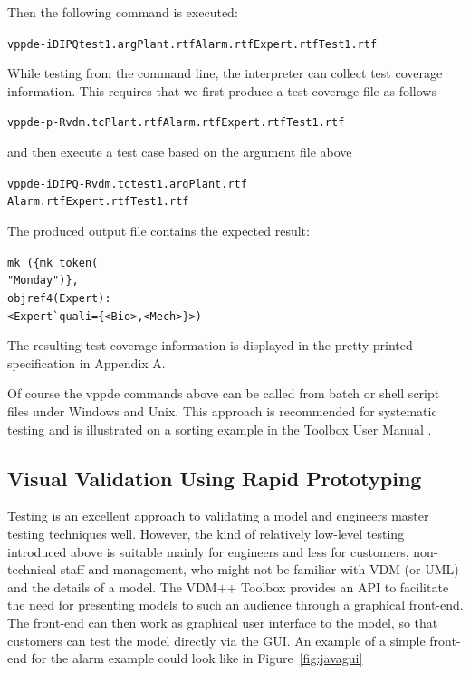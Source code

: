 \documentclass[\pformat,12pt,twoside]{article}
\begin{document}
Then the following command is executed: 

\small
\begin{alltt}
  vppde -iDIPQ test1.arg Plant.rtf Alarm.rtf Expert.rtf Test1.rtf
\end{alltt}
\normalsize

While testing from the command line, the interpreter can collect 
test coverage information. This requires that we first produce 
a test coverage file as follows

\small
\begin{alltt}
  vppde -p -R vdm.tc Plant.rtf Alarm.rtf Expert.rtf Test1.rtf
\end{alltt}
\normalsize

and then execute a test case based on the argument file above

\small
\begin{alltt}
  vppde -iDIPQ -R vdm.tc test1.arg Plant.rtf
                         Alarm.rtf Expert.rtf Test1.rtf
\end{alltt}
\normalsize

The produced output file contains the expected result:

\small
\begin{alltt}
  mk\_( \{ mk\_token( 
   "Monday" ) \},
   objref4(Expert):
   \texttt{<} Expert\`{}quali = \{ \texttt{<}Bio\texttt{>},\texttt{<}Mech\texttt{>} \} \texttt{>} )
\end{alltt}
\normalsize

The resulting test coverage information is displayed in the pretty-printed 
specification in Appendix A.

Of course the vppde commands above can be called from batch or 
shell script files under Windows and Unix. This approach is recommended 
for systematic testing and is illustrated on a sorting example 
in the Toolbox User Manual \cite{UserManPP-CSK}.

\subsection{Visual Validation Using Rapid Prototyping}

Testing is an excellent approach to validating a model and engineers 
master testing techniques well. However, the kind of relatively 
low-level testing introduced above is suitable mainly for engineers 
and less for customers, non-technical staff and management, who 
might not be familiar with VDM (or UML) and the details of a 
model. The VDM++ Toolbox provides an API to facilitate the need 
for presenting models to such an audience through a graphical 
front-end. The front-end can then work as graphical user interface 
to the model, so that customers can test the model directly via 
the GUI. An example of a simple front-end for the alarm example 
could look like in Figure~\ref{fig:javagui}
\end{document}

